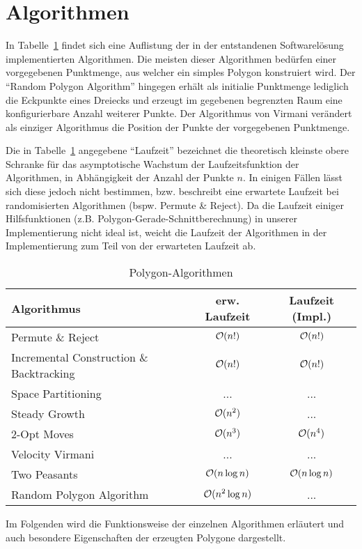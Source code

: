 \section{Algorithmen}
In Tabelle~\ref{algo_table} findet sich eine Auflistung der in der entstandenen Softwarelösung implementierten Algorithmen. Die meisten dieser Algorithmen bedürfen einer vorgegebenen Punktmenge, aus welcher ein simples Polygon konstruiert wird. Der \enquote{Random Polygon Algorithm} hingegen erhält als initialie Punktmenge lediglich die Eckpunkte eines Dreiecks und erzeugt im gegebenen begrenzten Raum eine konfigurierbare Anzahl weiterer Punkte. Der Algorithmus von Virmani verändert als einziger Algorithmus die Position der Punkte der vorgegebenen Punktmenge. 

Die in Tabelle~\ref{algo_table} angegebene \enquote{Laufzeit} bezeichnet die theoretisch kleinste obere Schranke für das asymptotische Wachstum der Laufzeitsfunktion der Algorithmen, in Abhängigkeit der Anzahl der Punkte $n$. In einigen Fällen lässt sich diese jedoch nicht bestimmen, bzw. beschreibt eine erwartete Laufzeit bei randomisierten Algorithmen (bspw. Permute \& Reject). Da die Laufzeit einiger Hilfsfunktionen (z.B. Polygon-Gerade-Schnittberechnung) in unserer Implementierung nicht ideal ist, weicht die Laufzeit der Algorithmen in der Implementierung zum Teil von der erwarteten Laufzeit ab. 

\begin{table}[ht]
\begin{center}
\caption{Polygon-Algorithmen}
\begin{tabular}{lcc} 
\toprule
Algorithmus & erw. Laufzeit & Laufzeit (Impl.) \\
\midrule
Permute \& Reject & $\mathcal{O}(n!)$ & $\mathcal{O}(n!)$ \\
Incremental Construction \& Backtracking & $\mathcal{O}(n!)$ & $\mathcal{O}(n!)$ \\
Space Partitioning & ... & ...\\
Steady Growth & $\mathcal{O}(n^2)$ & ... \\
2-Opt Moves & $\mathcal{O}(n^3)$ & $\mathcal{O}(n^4)$ \\
Velocity Virmani & ... & ...\\
Two Peasants & $\mathcal{O}(n \log n)$ & $\mathcal{O}(n \log n)$ \\
Random Polygon Algorithm & $\mathcal{O}(n^2 \log n)$ & ... \\
\bottomrule
\end{tabular}
\label{algo_table}
\end{center}
\end{table}

Im Folgenden wird die Funktionsweise der einzelnen Algorithmen erläutert und auch besondere Eigenschaften der erzeugten Polygone dargestellt.